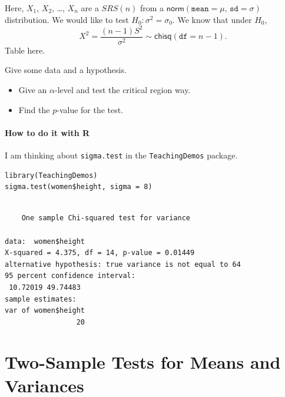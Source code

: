 \documentclass[captions=tableheading]{scrbook}
\begin{document}
Here, \(X_{1}\), \(X_{2}\), \ldots{}, \(X_{n}\) are a \(SRS(n)\) from a \(\mathsf{norm}(\mathtt{mean}=\mu,\,\mathtt{sd}=\sigma)\) distribution. We would like to test \(H_{0}:\sigma^{2}=\sigma_{0}\). We know that under \(H_{0}\),
\[
X^{2}=\frac{(n-1)S^{2}}{\sigma^{2}}\sim\mathsf{chisq}(\mathtt{df}=n-1).
\]
Table here.

\begin{example}
Give some data and a hypothesis.
\begin{itemize}
\item Give an \(\alpha\)-level and test the critical region way.
\item Find the \(p\)-value for the test.
\end{itemize}
\end{example}


\paragraph*{How to do it with \textsf{R}}
I am thinking about \texttt{sigma.test} in the \texttt{TeachingDemos} package.


\begin{verbatim}
library(TeachingDemos)
sigma.test(women$height, sigma = 8)
\end{verbatim}


\begin{verbatim}

	One sample Chi-squared test for variance

data:  women$height 
X-squared = 4.375, df = 14, p-value = 0.01449
alternative hypothesis: true variance is not equal to 64 
95 percent confidence interval:
 10.72019 49.74483 
sample estimates:
var of women$height 
                 20
\end{verbatim}
\section{Two-Sample Tests for Means and Variances}
\label{sec-10-3}

\label{sec:Two-Sample-Tests-for-Means}
\end{document}

